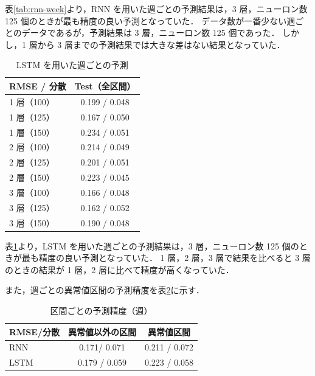 \documentclass[twocolumn,fleqn,10pt]{jarticle}
\begin{document}
表\ref{tab:rnn-week}より，RNN を用いた週ごとの予測結果は，3 層，ニューロン数 125 個のときが最も精度の良い予測となっていた．
データ数が一番少ない週ごとのデータであるが，予測結果は 3 層，ニューロン数 125 個であった．
しかし，1 層から 3 層までの予測結果では大きな差はない結果となっていた．





\begin{table}[t]
\centering
  \caption{LSTM を用いた週ごとの予測}
  \vspace{3mm}
  \begin{tabular}{|l||c|}  \hline
    RMSE / 分散 & Test（全区間） \\ \hline \hline
    1 層（100） & 0.199 / 0.048 \\ \hline
    1 層（125） & 0.167 / 0.050 \\ \hline
    1 層（150） & 0.234 / 0.051 \\ \hline

    2 層（100） & 0.214 / 0.049 \\ \hline
    2 層（125） & 0.201 / 0.051 \\ \hline
    2 層（150） & 0.223 / 0.045 \\ \hline

    3 層（100） & 0.166 / 0.048 \\ \hline
    3 層（125） & 0.162 / 0.052 \\ \hline
    3 層（150） & 0.190 / 0.048 \\ \hline
  \end{tabular}
  \label{tab:lstm-week}
\end{table}


表\ref{tab:lstm-week}より，LSTM を用いた週ごとの予測結果は，3 層，ニューロン数 125 個のときが最も精度の良い予測となっていた．
1 層，2 層，3 層で結果を比べると 3 層のときの結果が 1 層，2 層に比べて精度が高くなっていた．


また，週ごとの異常値区間の予測精度を表\ref{tab:ijou-week}に示す．



\begin{table}[t]
\centering
  \caption{区間ごとの予測精度（週）}
  \vspace{3mm}
  \begin{tabular}{|l||c|c|}  \hline
    RMSE/分散  & 異常値以外の区間 & 異常値区間 \\ \hline \hline
    RNN   &  0.171/ 0.071 & 0.211 / 0.072 \\ \hline
    LSTM  &  0.179 / 0.059 & 0.223 / 0.058 \\ \hline
  \end{tabular}
  \label{tab:ijou-week}
\end{table}
\end{document}

